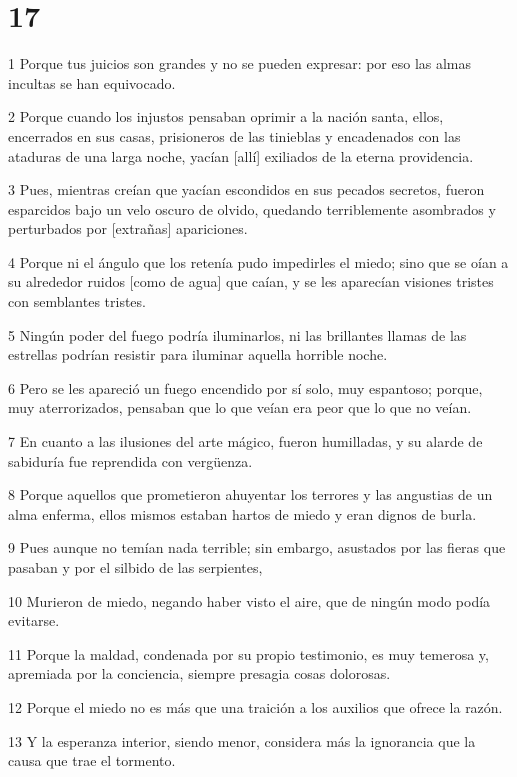 \chapter{17}

\par 1 Porque tus juicios son grandes y no se pueden expresar: por eso las almas incultas se han equivocado.
\par 2 Porque cuando los injustos pensaban oprimir a la nación santa, ellos, encerrados en sus casas, prisioneros de las tinieblas y encadenados con las ataduras de una larga noche, yacían [allí] exiliados de la eterna providencia.
\par 3 Pues, mientras creían que yacían escondidos en sus pecados secretos, fueron esparcidos bajo un velo oscuro de olvido, quedando terriblemente asombrados y perturbados por [extrañas] apariciones.
\par 4 Porque ni el ángulo que los retenía pudo impedirles el miedo; sino que se oían a su alrededor ruidos [como de agua] que caían, y se les aparecían visiones tristes con semblantes tristes.
\par 5 Ningún poder del fuego podría iluminarlos, ni las brillantes llamas de las estrellas podrían resistir para iluminar aquella horrible noche.
\par 6 Pero se les apareció un fuego encendido por sí solo, muy espantoso; porque, muy aterrorizados, pensaban que lo que veían era peor que lo que no veían.
\par 7 En cuanto a las ilusiones del arte mágico, fueron humilladas, y su alarde de sabiduría fue reprendida con vergüenza.
\par 8 Porque aquellos que prometieron ahuyentar los terrores y las angustias de un alma enferma, ellos mismos estaban hartos de miedo y eran dignos de burla.
\par 9 Pues aunque no temían nada terrible; sin embargo, asustados por las fieras que pasaban y por el silbido de las serpientes,
\par 10 Murieron de miedo, negando haber visto el aire, que de ningún modo podía evitarse.
\par 11 Porque la maldad, condenada por su propio testimonio, es muy temerosa y, apremiada por la conciencia, siempre presagia cosas dolorosas.
\par 12 Porque el miedo no es más que una traición a los auxilios que ofrece la razón.
\par 13 Y la esperanza interior, siendo menor, considera más la ignorancia que la causa que trae el tormento.
